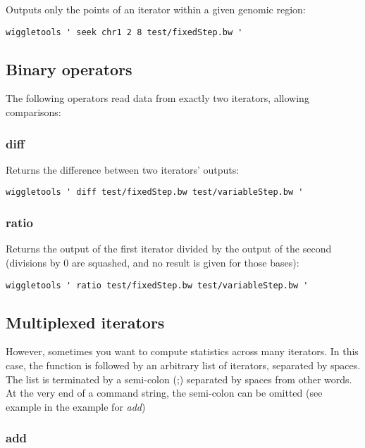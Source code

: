 \documentclass[12pt]{article}
\begin{document}
Outputs only the points of an iterator within a given genomic region:

\begin{verbatim}
wiggletools ' seek chr1 2 8 test/fixedStep.bw '
\end{verbatim}

\subsection{Binary operators}

The following operators read data from exactly two iterators, allowing comparisons:

\subsubsection{diff}

Returns the difference between two iterators' outputs:

\begin{verbatim}
wiggletools ' diff test/fixedStep.bw test/variableStep.bw '
\end{verbatim}

\subsubsection{ratio}

Returns the output of the first iterator divided by the output of the second (divisions by 0 are squashed, and no result is given for those bases):

\begin{verbatim}
wiggletools ' ratio test/fixedStep.bw test/variableStep.bw '
\end{verbatim}

\subsection{Multiplexed iterators}

However, sometimes you want to compute statistics across many iterators. In this case, the function is followed by an arbitrary list of iterators, separated by spaces. The list is terminated by a semi-colon (;) separated by spaces from other words. At the very end of a command string, the semi-colon can be omitted (see example in the example for \emph{add})

\subsubsection{add}
\end{document}
